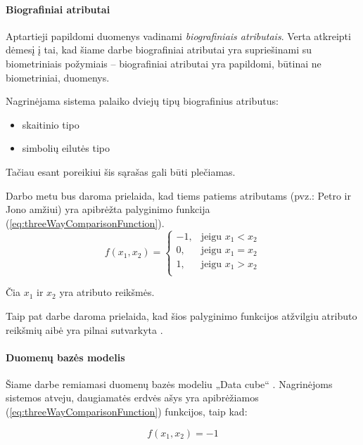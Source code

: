 \paragraph{Biografiniai atributai}

Aptartieji papildomi duomenys vadinami {\it biografiniais atributais}.
Verta atkreipti dėmesį į tai, kad šiame darbe biografiniai atributai yra supriešinami su biometriniais požymiais -- biografiniai atributai yra papildomi, būtinai ne biometriniai, duomenys.

Nagrinėjama sistema palaiko dviejų tipų biografinius atributus:
\begin{itemize}
\item skaitinio tipo
\item simbolių eilutės tipo
\end{itemize}
Tačiau esant poreikiui šis sąrašas gali būti plečiamas.

Darbo metu bus daroma prielaida, kad tiems patiems atributams (pvz.: Petro ir Jono amžiui) yra apibrėžta palyginimo funkcija (\ref{eq:threeWayComparisonFunction}).
\begin{equation}
	f(x_1, x_2)=
\begin{cases}
	-1,& \text{jeigu } x_1 < x_2\\
	0,& \text{jeigu } x_1 = x_2\\
	1,& \text{jeigu } x_1 > x_2\\
\end{cases}
\label{eq:threeWayComparisonFunction}
\end{equation}

Čia $x_1$ ir $x_2$ yra atributo reikšmės.

Taip pat darbe daroma prielaida, kad šios palyginimo funkcijos atžvilgiu atributo reikšmių aibė yra pilnai sutvarkyta \cite{hrbacek1999introduction}.






\paragraph{Duomenų bazės modelis}

Šiame darbe remiamasi duomenų bazės modeliu „Data cube“ \cite{marcel2000modeling}.
Nagrinėjoms sistemos \cite{NeurotechnologyMegamatcherAccelerator} atveju, daugiamatės erdvės ašys yra apibrėžiamos (\ref{eq:threeWayComparisonFunction}) funkcijos, taip kad:

\begin{equation}
	f(x_1, x_2)=-1
\label{eq:increasingOrderOfAtributes}
\end{equation}

